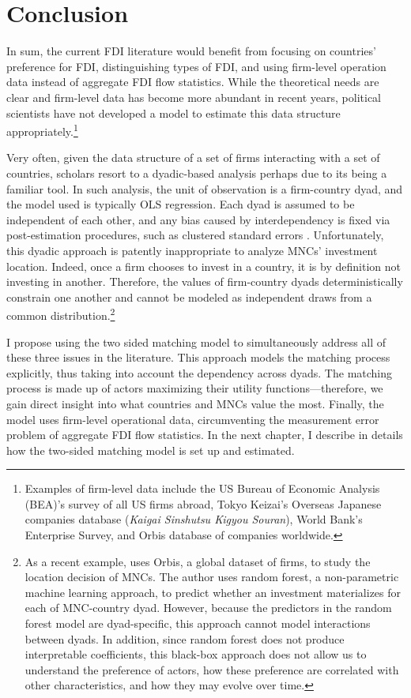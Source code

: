 \section{Conclusion}

In sum, the current FDI literature would benefit from focusing on countries'
preference for FDI, distinguishing types of FDI, and using firm-level operation
data instead of aggregate FDI flow statistics. While the theoretical needs are
clear and firm-level data has become more abundant in recent years, political
scientists have not developed a model to estimate this data structure
appropriately.\footnote{Examples of firm-level data include the US Bureau of
  Economic Analysis (BEA)'s survey of all US firms abroad, Tokyo Keizai's
  Overseas Japanese companies database (\textit{Kaigai Sinshutsu Kigyou
    Souran}), World Bank's Enterprise Survey, and Orbis database of companies
  worldwide.}

Very often, given the data structure of a set of firms interacting with a set of
countries, scholars resort to a dyadic-based analysis perhaps due to its being a
familiar tool. In such analysis, the unit of observation is a firm-country dyad,
and the model used is typically OLS regression. Each dyad is assumed to be
independent of each other, and any bias caused by interdependency is fixed via
post-estimation procedures, such as clustered standard errors \citep{Dorff2013}.
Unfortunately, this dyadic approach is patently inappropriate to analyze MNCs'
investment location. Indeed, once a firm chooses to invest in a country, it is
by definition not investing in another. Therefore, the values of firm-country
dyads deterministically constrain one another and cannot be modeled as
independent draws from a common distribution.\footnote{As a recent example,
  \citet{Arel-Bundock2017} uses Orbis, a global dataset of firms, to study the
  location decision of MNCs. The author uses random forest, a non-parametric
  machine learning approach, to predict whether an investment materializes for
  each of MNC-country dyad. However, because the predictors in the random forest
  model are dyad-specific, this approach cannot model interactions between
  dyads. In addition, since random forest does not produce interpretable
  coefficients, this black-box approach does not allow us to understand the
  preference of actors, how these preference are correlated with other
  characteristics, and how they may evolve over time.}

I propose using the two sided matching model to simultaneously address all of
these three issues in the literature. This approach models the matching process
explicitly, thus taking into account the dependency across dyads. The matching
process is made up of actors maximizing their utility functions---therefore, we
gain direct insight into what countries and MNCs value the most. Finally, the
model uses firm-level operational data, circumventing the measurement error
problem of aggregate FDI flow statistics. In the next chapter, I describe in
details how the two-sided matching model is set up and estimated.

